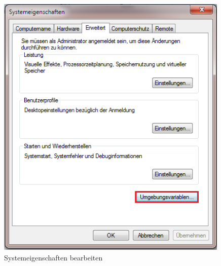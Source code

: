 \begin{appendix}
        \begin{figure}[ht]
            \centering
            \includegraphics[width=0.99\textwidth]{src/pictures/win-eigenschaften.png}
            \caption{Systemeigenschaften bearbeiten}
            \label{img:win:sysvar2}
        \end{figure}


\end{appendix}
